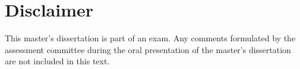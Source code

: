 \chapter*{Disclaimer}

This master's dissertation is part of an exam. Any comments formulated by
the assessment committee during the oral presentation of the master's dissertation
are not included in this text.